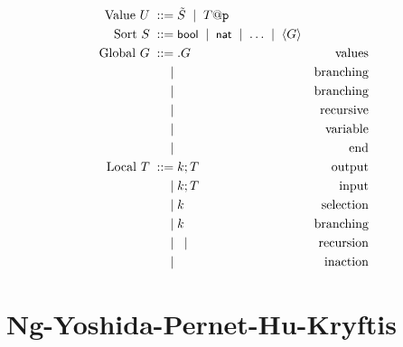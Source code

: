 \documentclass{article}
\begin{document}
\begin{align*}
  \text{Value}\ U
    \grmeq & \VEC{S} \grmor T@\participant{p} \\
  \text{Sort}\ S
  \grmeq & \keyword{bool} \grmor \keyword{nat} \grmor \dots \grmor \langle G\rangle\\
  \text{Global}\ G
    \grmeq & \gsendType[k] p{p'}UG   & \text{values}\\
    \grmor & \gbranchType[k] p{p'}lG & \text{branching}\\
    \grmor & \gparType G{G'}         & \text{branching}\\
    \grmor & \grecurType tG          & \text{recursive}\\
    \grmor & \grecvarType t          & \text{variable}\\
    \grmor & \gendType               & \text{end}\\
  \text{Local}\ T
    \grmeq & \sendType[k] UT   & \text{output}\\
    \grmor & \recvType[k] UT   & \text{input}\\
    \grmor & \selectType[k] lT & \text{selection}\\
    \grmor & \branchType[k] lT & \text{branching}\\
    \grmor & \recurType tT \grmor \recvarType t
                               & \text{recursion}\\
    \grmor & \EndType          & \text{inaction}\\
\end{align*}

\section{Ng-Yoshida-Pernet-Hu-Kryftis}
\end{document}
